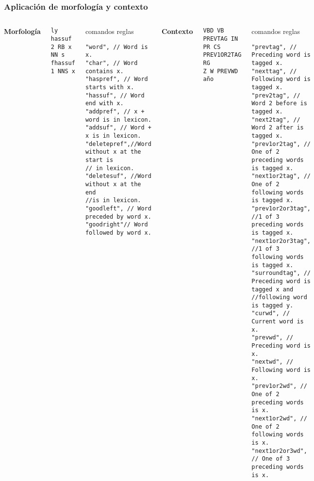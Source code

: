 \documentclass{beamer}
\begin{document}
\begin{frame}[fragile]
\frametitle{Aplicación de morfología y contexto}
\begin{columns}[t]
\textbf{Morfología}
\begin{example}
\begin{scriptsize}
\begin{verbatim}
ly hassuf 2 RB x
NN s fhassuf 1 NNS x
\end{verbatim}\end{scriptsize}
\end{example}
\begin{tiny}\begin{block}{comandos reglas}
\begin{verbatim}
"word", // Word is x.
"char", // Word contains x.
"haspref", // Word starts with x.
"hassuf", // Word end with x.
"addpref", // x + word is in lexicon.
"addsuf", // Word + x is in lexicon.
"deletepref",//Word without x at the start is
// in lexicon.
"deletesuf", //Word without x at the end 
//is in lexicon.
"goodleft", // Word preceded by word x.
"goodright"// Word followed by word x.
\end{verbatim}\end{block}\end{tiny}

\textbf{Contexto}
\begin{example}
\begin{scriptsize}
\begin{verbatim}
VBD VB PREVTAG IN
PR CS PREV1OR2TAG RG
Z W PREVWD año
\end{verbatim}
\end{scriptsize}
\end{example}
\begin{tiny}\begin{block}{comandos reglas}
\begin{verbatim}
"prevtag", // Preceding word is tagged x.
"nexttag", // Following word is tagged x.
"prev2tag", // Word 2 before is tagged x.
"next2tag", // Word 2 after is tagged x.
"prev1or2tag", // One of 2 preceding words is tagged x.
"next1or2tag", // One of 2 following words is tagged x.
"prev1or2or3tag", //1 of 3 preceding words is tagged x.
"next1or2or3tag", //1 of 3 following words is tagged x.
"surroundtag", // Preceding word is tagged x and 
//following word is tagged y.
"curwd", // Current word is x.
"prevwd", // Preceding word is x.
"nextwd", // Following word is x.
"prev1or2wd", // One of 2 preceding words is x.
"next1or2wd", // One of 2 following words is x.
"next1or2or3wd", // One of 3 preceding words is x.
\end{verbatim}\end{block}\end{tiny}
\end{columns}
\end{frame}
\end{document}
